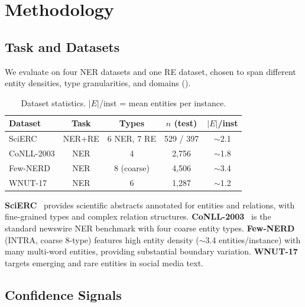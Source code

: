 \documentclass[11pt,a4paper]{article}
\begin{document}
\section{Methodology}

\subsection{Task and Datasets}

We evaluate on four NER datasets and one RE dataset, chosen to span different entity densities, type granularities, and domains ().

\begin{table}[t]
\centering
\small
\caption{Dataset statistics. $|E|$/inst = mean entities per instance.}
\label{tab:datasets}
\begin{tabular}{lcccc}
\toprule
\textbf{Dataset} & \textbf{Task} & \textbf{Types} & \textbf{$n$ (test)} & \textbf{$|E|$/inst} \\
\midrule
SciERC       & NER+RE & 6 NER, 7 RE & 529 / 397  & $\sim$2.1 \\
CoNLL-2003   & NER    & 4            & 2,756      & $\sim$1.8 \\
Few-NERD     & NER    & 8 (coarse)   & 4,506      & $\sim$3.4 \\
WNUT-17      & NER    & 6            & 1,287      & $\sim$1.2 \\
\bottomrule
\end{tabular}
\end{table}

\textbf{SciERC}~\citep{luan2018scierc} provides scientific abstracts annotated for entities and relations, with fine-grained types and complex relation structures.
\textbf{CoNLL-2003}~\citep{tjong2003conll} is the standard newswire NER benchmark with four coarse entity types.
\textbf{Few-NERD}~\citep{ding2021fewnerd} (INTRA, coarse 8-type) features high entity density ($\sim$3.4 entities/instance) with many multi-word entities, providing substantial boundary variation.
\textbf{WNUT-17}~\citep{derczynski2017wnut} targets emerging and rare entities in social media text.

\subsection{Confidence Signals}
\label{sec:signals}
\end{document}
